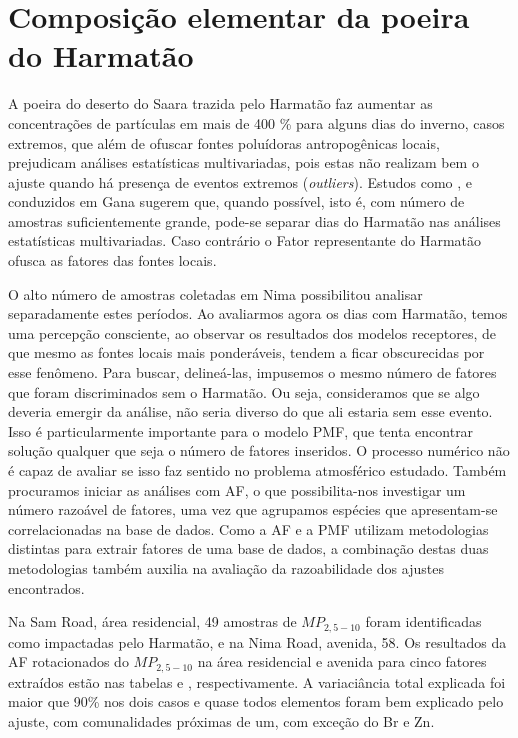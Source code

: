 \newpage
\section{Composição elementar da poeira do Harmatão}

A poeira do deserto do Saara trazida pelo Harmatão faz aumentar as concentrações
de partículas em mais de 400 \% para alguns dias do inverno, casos extremos, 
que além de ofuscar fontes poluídoras antropogênicas locais, prejudicam 
análises estatísticas multivariadas, pois estas não realizam bem o ajuste 
quando há presença de eventos extremos (\textit{outliers}). Estudos como 
\citet{aboh2009}, \citet{ofosu2013} e \citet{ofosu2012} conduzidos em Gana 
sugerem que, quando possível, isto é, com número de amostras suficientemente 
grande, pode-se separar dias do Harmatão nas análises estatísticas multivariadas. 
Caso contrário o Fator representante do Harmatão ofusca as fatores das fontes 
locais. 

O alto número de amostras coletadas em Nima possibilitou analisar separadamente estes períodos.
Ao avaliarmos agora os dias com Harmatão, temos uma percepção consciente, ao observar os resultados dos modelos receptores, de que mesmo as fontes locais mais ponderáveis, tendem a ficar obscurecidas por esse fenômeno. Para buscar, delineá-las, impusemos o mesmo número de fatores que foram discriminados sem o Harmatão. Ou seja, consideramos que se algo deveria emergir da análise, não seria diverso do que ali estaria sem esse evento. Isso é particularmente importante para o modelo PMF, que tenta encontrar solução qualquer que seja o número de fatores inseridos. O processo numérico não é capaz de avaliar se isso faz sentido no problema atmosférico estudado. Também procuramos iniciar as análises com AF, o que possibilita-nos investigar um número razoável de fatores, uma vez que agrupamos espécies que apresentam-se correlacionadas na base de dados. Como a AF e a PMF utilizam metodologias distintas para extrair fatores de uma base de dados, a combinação destas duas metodologias também auxilia na avaliação da razoabilidade dos ajustes encontrados.

Na Sam Road, área residencial, 49 amostras de $MP_{2,5-10}$ foram identificadas 
como impactadas pelo Harmatão, e na Nima Road, avenida, 58. Os resultados 
da AF rotacionados do $MP_{2,5-10}$ na área residencial e avenida para cinco 
fatores extraídos estão nas tabelas \label{table:AF_RGeH5} e \label{table:AF_TGeH5}, 
respectivamente.  A variaciância total explicada foi maior que 90\% nos dois  
casos e quase todos elementos foram bem explicado pelo ajuste, com comunalidades 
próximas de um, com exceção do Br e Zn. 

